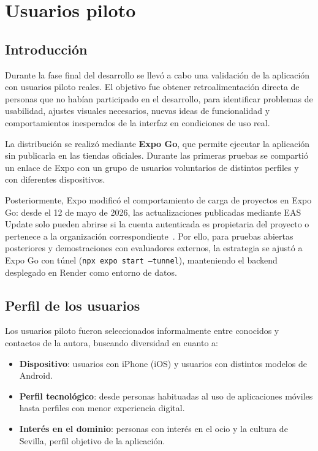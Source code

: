 \chapter{Usuarios piloto}\label{anexo:usuarios_piloto}

\section{Introducción}

Durante la fase final del desarrollo se llevó a cabo una validación de la aplicación con usuarios piloto reales. El objetivo fue obtener retroalimentación directa de personas que no habían participado en el desarrollo, para identificar problemas de usabilidad, ajustes visuales necesarios, nuevas ideas de funcionalidad y comportamientos inesperados de la interfaz en condiciones de uso real.

La distribución se realizó mediante \textbf{Expo Go}, que permite ejecutar la aplicación sin publicarla en las tiendas oficiales. Durante las primeras pruebas se compartió un enlace de Expo con un grupo de usuarios voluntarios de distintos perfiles y con diferentes dispositivos.

Posteriormente, Expo modificó el comportamiento de carga de proyectos en Expo Go: desde el 12 de mayo de 2026, las actualizaciones publicadas mediante EAS Update solo pueden abrirse si la cuenta autenticada es propietaria del proyecto o pertenece a la organización correspondiente~\cite{expoGoLoading2026}. Por ello, para pruebas abiertas posteriores y demostraciones con evaluadores externos, la estrategia se ajustó a Expo Go con túnel (\texttt{npx expo start --tunnel}), manteniendo el backend desplegado en Render como entorno de datos.

\section{Perfil de los usuarios}

Los usuarios piloto fueron seleccionados informalmente entre conocidos y contactos de la autora, buscando diversidad en cuanto a:

\begin{itemize}
    \item \textbf{Dispositivo}: usuarios con iPhone (iOS) y usuarios con distintos modelos de Android.
    \item \textbf{Perfil tecnológico}: desde personas habituadas al uso de aplicaciones móviles hasta perfiles con menor experiencia digital.
    \item \textbf{Interés en el dominio}: personas con interés en el ocio y la cultura de Sevilla, perfil objetivo de la aplicación.
\end{itemize}


